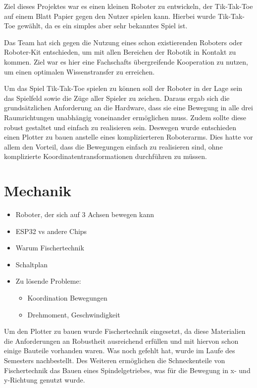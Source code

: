 \documentclass[conference,compsoc,final,a4paper]{IEEEtran}
\begin{document}
Ziel dieses Projektes war es einen kleinen Roboter zu entwickeln, der Tik-Tak-Toe
auf einem Blatt Papier gegen den Nutzer spielen kann. Hierbei wurde Tik-Tak-Toe
gewählt, da es ein simples aber sehr bekanntes Spiel ist.

Das Team hat sich gegen die Nutzung eines schon existierenden Roboters oder Roboter-Kit
entschieden, um mit allen Bereichen der Robotik in Kontakt zu kommen. Ziel war es hier
eine Fachschafts übergreifende Kooperation zu nutzen, um einen optimalen Wissenstransfer
zu erreichen.

Um das Spiel Tik-Tak-Toe spielen zu können soll der Roboter in der Lage sein das Spielfeld
sowie die Züge aller Spieler zu zeichen. Daraus ergab sich die grundsätzlichen Anforderung
an die Hardware, dass sie eine Bewegung in alle drei Raumrichtungen unabhängig voneinander
ermöglichen muss. Zudem sollte diese robust gestaltet und einfach zu realisieren sein.
Deswegen wurde entschieden einen Plotter zu bauen anstelle eines komplizierteren
Roboterarms. Dies hatte vor allem den Vorteil, dass die Bewegungen einfach zu realisieren
sind, ohne komplizierte Koordinatentransformationen durchführen zu müssen.


\section{Mechanik}

\begin{itemize}
  \item Roboter, der sich auf 3 Achsen bewegen kann
  \item ESP32 vs andere Chips
  \item Warum Fischertechnik
  \item Schaltplan
  \item Zu lösende Probleme:
    \begin{itemize}
      \item Koordination Bewegungen
      \item Drehmoment, Geschwindigkeit
    \end{itemize}
\end{itemize}

Um den Plotter zu bauen wurde Fischertechnik eingesetzt, da diese Materialien die Anforderungen
an Robustheit ausreichend erfüllen und mit hiervon schon einige Bauteile vorhanden waren. Was
noch gefehlt hat, wurde im Laufe des Semesters nachbestellt. Des Weiteren ermöglichen die
Schneckenteile von Fischertechnik das Bauen eines Spindelgetriebes, was für die Bewegung in x-
und y-Richtung genutzt wurde.
\end{document}
